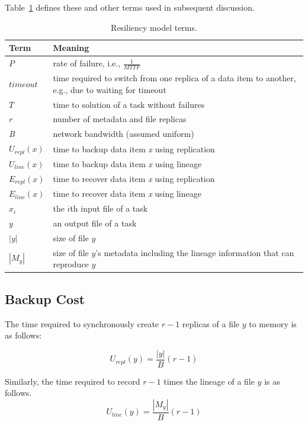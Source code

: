 \documentclass{sig-alternate}
\begin{document}
Table~\ref{tab:modelterms} defines these and other terms used in subsequent discussion. 

\begin{table}
\centering
\caption{Resiliency model terms.}
\label{tab:modelterms}
\begin{tabular}{|p{1cm}|p{6.25cm}|} \hline
Term & Meaning \\ \hline
{$P$} 					& rate of failure, i.e., $\frac{1}{MTTF}$ \\
{$timeout$} 					& time required to switch from one replica of a data item to another, e.g., due to waiting for timeout \\
{$T$}					& time to solution of a task without failures\\
{$r$} 					& number of metadata and file replicas \\
{\em B} 				& network bandwidth (assumed uniform) \\
{$U_{repl}(x)$} &  time to backup data item {\em x} using replication \\
{$U_{line}(x)$} &  time to backup data item {\em x} using lineage \\
{$E_{repl}(x)$} &   time to recover data item {\em x} using replication \\
{$E_{line}(x)$} &   time to recover data item {\em x} using lineage \\
{$x_i$} 				& the $i$th input file of a task \\
{$y$}				& an output file of a task \\
{$|y|$}				& size of file $y$ \\
{$|M_{y}|$}		& size of file $y$'s metadata including the lineage information that can reproduce $y$\\
\hline\end{tabular}
\end{table}


\subsection{Backup Cost}
The time required to synchronously create $r-1$ replicas of a file $y$ to memory is as follows:

\begin{equation}
U_{repl}(y) = \frac{|y|}{B} (r-1)
\end{equation}

Similarly, the time required to record $r-1$ times the lineage of a file $y$ is as follows.
\begin{equation}
U_{line}(y) = \frac{|M_{y}|}{B} (r-1)
\end{equation}
\end{document}

